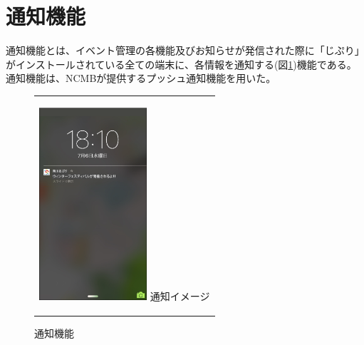 \section{通知機能}%
\label{func:notice}
通知機能とは、イベント管理の各機能及びお知らせが発信された際に「じぷり」がインストールされている全ての端末に、各情報を通知する(図\ref{fig:notice})機能である。通知機能は、NCMBが提供するプッシュ通知機能を用いた。

\begin{figure}[htbp]
  \begin{center}
    \begin{tabular}{c}

      \begin{minipage}{0.33\hsize}
        \begin{center}
\includegraphics[width=4cm]{notification.png}
          \hspace{1cm} %
          {\footnotesize 通知イメージ}
        \end{center}
      \end{minipage}

    \end{tabular}
    \caption{通知機能}
    \label{fig:notice}
  \end{center}
\end{figure}

